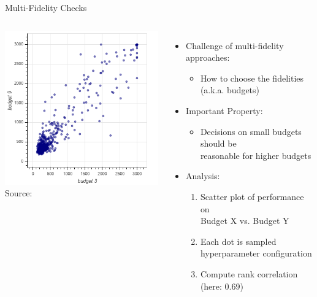 \begin{frame}[c]{Multi-Fidelity Checks}

\begin{columns}
	
	\begin{center}
		\includegraphics[width=1.0\textwidth]{images/budget_scatter.png}\\
		Source: 
	\end{center}
	
	
	\begin{itemize}
		\item Challenge of multi-fidelity approaches:
		\begin{itemize}
			\item How to choose the fidelities (a.k.a. budgets)
		\end{itemize}
		 \pause
		\item Important Property:
		\begin{itemize}
			\item Decisions on small budgets should be\\
			 reasonable for higher budgets
		\end{itemize}
			 \pause
		\item Analysis:
		\begin{enumerate}
			\item Scatter plot of performance on\\
			 Budget X vs. Budget Y
			\item Each dot is sampled hyperparameter configuration
			\item Compute rank correlation (here: 0.69)
		\end{enumerate}
	\end{itemize}
	
\end{columns}


\end{frame}



